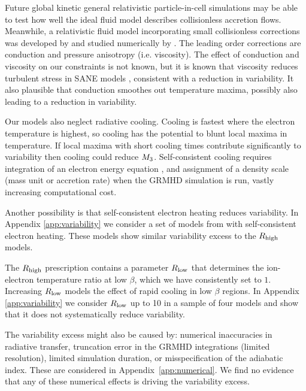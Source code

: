 Future global kinetic general relativistic particle-in-cell simulations may be able to test how well the ideal fluid model describes collisionless accretion flows.
Meanwhile, a relativistic fluid model incorporating small collisionless corrections was developed by \citet{2015ApJ...810..162C} and studied numerically by \citet{2017MNRAS.470.2240F}.
The leading order corrections are conduction and pressure anisotropy (i.e. viscosity).
The effect of conduction and viscosity on our constraints is not known, but it is known that viscosity reduces turbulent stress in SANE models \citep{2017MNRAS.470.2240F}, consistent with a reduction in variability.
It also plausible that conduction smoothes out temperature maxima, possibly also leading to a reduction in variability.

Our models also neglect radiative cooling.
Cooling is fastest where the electron temperature is highest, so cooling has the potential to blunt  local maxima in temperature.
If local maxima with short cooling times contribute significantly to variability then cooling could reduce $M_{3}$.
Self-consistent cooling requires integration of an electron energy equation  \citep[e.g.]{2015MNRAS.454.1848R}, and assignment of a density scale (mass unit or accretion rate) when the GRMHD simulation is run, vastly increasing computational cost.

Another possibility is that self-consistent electron heating reduces variability.
In Appendix \ref{app:variability} we consider a set of models from \citet{2020MNRAS.494.4168D}
with self-consistent electron heating.
These models show similar variability excess to the $R_\mathrm{high}$ models.

The $R_\mathrm{high}$ prescription contains a parameter $R_\mathrm{low}$ that determines the ion-electron temperature ratio at low $\beta$, which we have consistently set to $1$.
Increasing $R_\mathrm{low}$ models the effect of rapid cooling in low $\beta$ regions.
In Appendix \ref{app:variability} we consider $R_\mathrm{low}$ up to 10 in a sample of four models and show that it does not systematically reduce variability.

The variability excess might also be caused by: numerical inaccuracies in radiative transfer, truncation error in the GRMHD integrations (limited resolution), limited simulation duration, or misspecification of the adiabatic index.
These are considered in Appendix~\ref{app:numerical}.
We find no evidence that any of these numerical effects is driving the variability excess.


